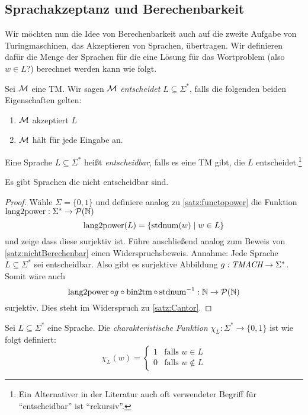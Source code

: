 \subsection{Sprachakzeptanz und Berechenbarkeit}
Wir möchten nun die Idee von Berechenbarkeit auch auf die zweite Aufgabe von Turingmaschinen, das Akzeptieren von Sprachen, übertragen.
Wir definieren dafür die Menge der Sprachen für die eine Lösung für das Wortproblem (also $w\in L$?) berechnet werden kann wie folgt.

\begin{Def}[name={[Entscheidbarkeit]}]
	Sei $\mathcal{M}$ eine \ac{TM}.
	Wir sagen $\mathcal{M}$ \emph{entscheidet} $L\subseteq\Sigma^*$, falls die folgenden beiden Eigenschaften gelten:
	\begin{enumerate}
	\item $\mathcal{M}$ akzeptiert $L$
	\item $\mathcal{M}$ hält für jede Eingabe an.
	\end{enumerate}
	
    Eine Sprache $L\subseteq\Sigma^*$ heißt \emph{entscheidbar}, falls es eine \ac{TM} gibt, die $L$ entscheidet.\footnote{
    Ein Alternativer in der Literatur auch oft verwendeter Begriff für "`entscheidbar"' ist "`rekursiv"'.}
\end{Def}


\begin{Satz}
 Es gibt Sprachen die nicht entscheidbar sind.
\end{Satz}

\begin{proof}
Wähle $\Sigma=\{0,1\}$ 
und definiere analog zu \autoref{satz:functopower} die Funktion $\operatorname{lang2power}:\Sigma^*\rightarrow \mathcal{P}(\mathbb{N})$
$$\operatorname{lang2power}(L)=\{\operatorname{stdnum}(w) \mid w\in L\}$$
und zeige dass diese surjektiv ist.
Führe anschließend analog zum Beweis von \autoref{satz:nichtBerechenbar} einen Widerspruchsbeweis.
Annahme: Jede Sprache $L\subseteq\Sigma^*$ sei entscheidbar. Also gibt es surjektive Abbildung $g:\textit{TMACH}\rightarrow\Sigma^*$.
Somit wäre auch 
$$\operatorname{lang2power}\circ g \circ\operatorname{bin2tm}\circ \operatorname{stdnum}^{-1}:\mathbb{N}\rightarrow\mathcal{P}(\mathbb{N})$$
surjektiv.
Dies steht im Widerspruch zu \autoref{satz:Cantor}.
\end{proof}




\begin{Def}
Sei $L\subseteq\Sigma^*$ eine Sprache. Die \emph{charakteristische Funktion} $\chi_L:\Sigma^*\rightarrow\{0,1\}$ ist wie folgt definiert:
$$
\chi_L(w)=\begin{cases}
1 & \text{falls } w\in L\\
0 & \text{falls } w\notin L           
\end{cases} %
$$
\end{Def}

